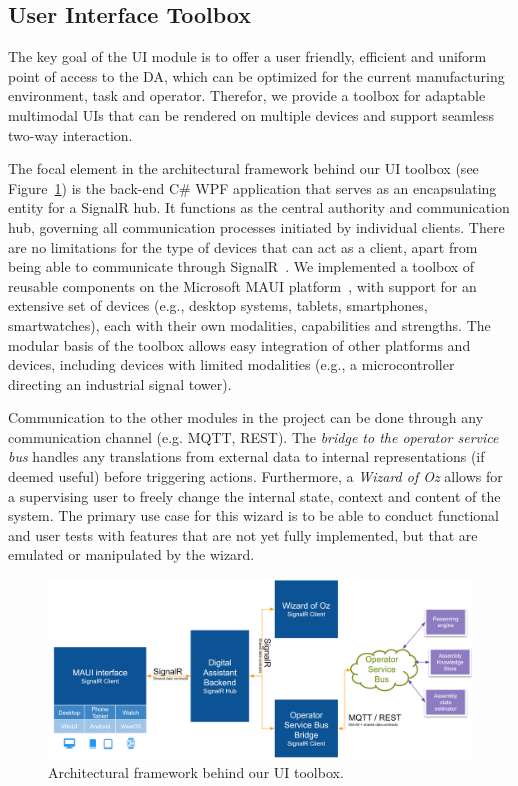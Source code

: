 \subsection{User Interface Toolbox}\label{sec:UI}
The key goal of the UI module is to offer a user friendly, efficient and uniform point of access to the DA, which can be optimized for the current manufacturing environment, task and operator. Therefor, we provide a toolbox for adaptable multimodal UIs that can be rendered on multiple devices and support seamless two-way interaction.

The focal element in the architectural framework behind our UI toolbox (see Figure~\ref{fig:ui-architecture}) is the back-end C\# WPF application that serves as an encapsulating entity for a SignalR hub. It functions as the central authority and communication hub, governing all communication processes initiated by individual clients. There are no limitations for the type of devices that can act as a client, apart from being able to communicate through SignalR~\cite{SignalR01,Sharma_2023}. We implemented a toolbox of reusable components on the Microsoft MAUI platform~\cite{Maui01,Maui02}, with support for an extensive set of devices (e.g., desktop systems, tablets, smartphones, smartwatches), each with their own modalities, capabilities and strengths. The modular basis of the toolbox allows easy integration of other platforms and devices, including devices with limited modalities (e.g., a microcontroller directing an industrial signal tower).

Communication to the other modules in the project can be done through any communication channel (e.g. MQTT, REST). The \emph{bridge to the operator service bus} handles any translations from external data to internal representations (if deemed useful) before triggering actions. Furthermore, a \emph{Wizard of Oz} allows for a supervising user to freely change the internal state, context and content of the system. The primary use case for this wizard is to be able to conduct functional and user tests with features that are not yet fully implemented, but that are emulated or manipulated by the wizard.

\begin{figure}
    \centering
    \includegraphics[width=1\linewidth]{figs/UI-architecture.png}
    \caption{Architectural framework behind our UI toolbox.}
    \label{fig:ui-architecture}
\end{figure}

